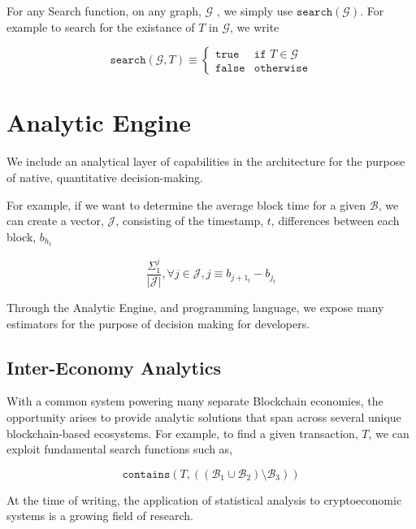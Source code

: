 \documentclass[12pt, titlepage, twocolumn]{report}
\begin{document}
For any Search function, on any graph, \(\mathcal{G}\) , we simply use \(\texttt{search}(\mathcal{G})\). For example to search for the existance of \(T\) in \(\mathcal{G}\), we write 

\begin{equation}
	\texttt{search}(\mathcal{G}, T) \equiv
	\begin{cases}
		\texttt{true} & \texttt{if } T \in \mathcal{G} \\
		\texttt{false} & \texttt{otherwise}
	\end{cases}
\end{equation}


\section{Analytic Engine} 
We include an analytical layer of capabilities in the architecture for the purpose of native, quantitative decision-making. 

For example, if we want to determine the average block time for a given \( \boldsymbol{\mathcal{B}} \), we can create a vector, \(\mathcal{J}\), consisting of the timestamp, \(t\), differences between each block, \(b_{h_{t}}\)


\begin{equation}
	\frac{\Sigma_{1}^{j} }{\vert \mathcal{J} \vert} , \forall j \in \mathcal{J} , j \equiv b_{j+1_{t}} - b_{j_{t}}
\end{equation}

Through the Analytic Engine, and programming language, we expose many estimators for the purpose of decision making for developers.

\subsection{Inter-Economy Analytics}
With a common system powering many separate Blockchain economies, the opportunity arises to provide analytic solutions that span across several unique blockchain-based ecosystems. For example, to find a given transaction, \(T\), we can exploit fundamental search functions such as,

\begin{equation}
	\texttt{contains}(T, ((\boldsymbol{\mathcal{B}}_1 \cup \boldsymbol{\mathcal{B}}_2) \setminus \boldsymbol{\mathcal{B}}_3))
\end{equation}

At the time of writing, the application of statistical analysis to cryptoeconomic systems is a growing field of research.
\end{document}
